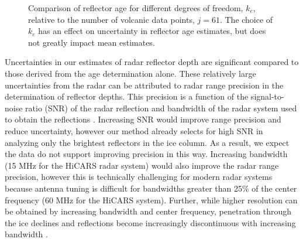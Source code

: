 \begin{figure*}[ht]
\begin{center}
{}
\caption{Comparison of reflector age for different degrees of freedom, $k_e$, relative to the number of volcanic data points, $j=61$. The choice of $k_e$ has an effect on uncertainty in reflector age estimates, but does not greatly impact mean estimates. }
\end{center}
\label{fig:ke}
\end{figure*}


Uncertainties in our estimates of radar reflector depth are significant compared to those derived from the age determination alone. These relatively large uncertainties from the radar can be attributed to radar range precision in the determination of reflector depths. This precision is a function of the signal-to-noise ratio (SNR) of the radar reflection and bandwidth of the radar system used to obtain the reflections \citep{cavitte2016}. Increasing SNR would improve range precision and reduce uncertainty, however our method already selects for high SNR in analyzing only the brightest reflectors in the ice column. As a result, we expect the data do not support improving precision in this way. Increasing bandwidth (15 MHz for the HiCARS radar system) would also improve the radar range precision, however this is technically challenging for modern radar systems because antenna tuning is difficult for bandwidths greater than 25\% of the center frequency (60 MHz for the HiCARS system). Further, while higher resolution can be obtained by increasing bandwidth and center frequency, penetration through the ice declines and reflections become increasingly discontinuous with increasing bandwidth \citep{cavitte2016}.






